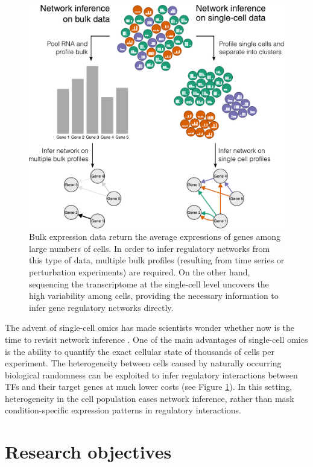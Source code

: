 \begin{figure}[htb!]
	\centering
	\includegraphics[width=\Largefigure]{fig/ni_bulk_vs_sc}
	\caption{Bulk expression data return the average expressions of genes among large numbers of cells. In order to infer regulatory networks from this type of data, multiple bulk profiles (resulting from time series or perturbation experiments) are required. On the other hand, sequencing the transcriptome at the single-cell level uncovers the high variability among cells, providing the necessary information to infer gene regulatory networks directly.} %
	\label{fig:bulk_vs_singlecell}
\end{figure}

The advent of single-cell omics has made scientists wonder whether now is the time to revisit network inference \cite{stegle_computationalanalyticalchallenges_2015}. 
One of the main advantages of single-cell omics is the ability to quantify the exact cellular state of thousands of cells per experiment. The heterogeneity between cells caused by naturally occurring biological randomness \cite{padovan-merhar_usingvariabilitygene_2013} can be exploited to infer regulatory interactions between TFs and their target genes at much lower costs (see Figure \ref{fig:bulk_vs_singlecell}).
In this setting, heterogeneity in the cell population eases network inference, rather than mask condition-specific expression patterns in regulatory interactions.

\section{Research objectives}

